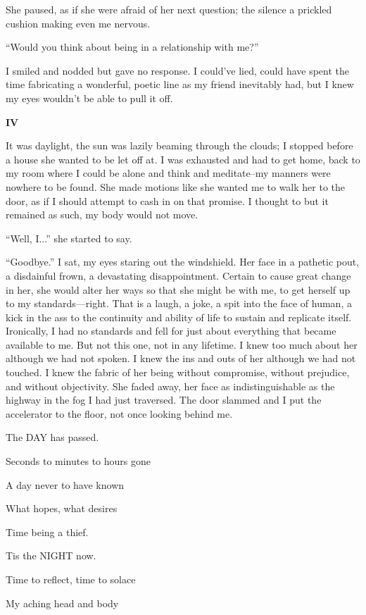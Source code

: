 She paused, as if she were afraid of her next question; the silence a
prickled cushion making even me nervous.

``Would you think about being in a relationship with me?''

I smiled and nodded but gave no response. I could've lied, could have
spent the time fabricating a wonderful, poetic line as my friend
inevitably had, but I knew my eyes wouldn't be able to pull it off.

\textbf{IV}

It was daylight, the sun was lazily beaming through the clouds; I
stopped before a house she wanted to be let off at. I was exhausted and
had to get home, back to my room where I could be alone and think and
meditate--my manners were nowhere to be found. She made motions like she
wanted me to walk her to the door, as if I should attempt to cash in on
that promise. I thought to but it remained as such, my body would not
move.

``Well, I...'' she started to say.

``Goodbye.'' I sat, my eyes staring out the windshield. Her face in a
pathetic pout, a disdainful frown, a devastating disappointment. Certain
to cause great change in her, she would alter her ways so that she might
be with me, to get herself up to my standards---right. That is a laugh,
a joke, a spit into the face of human, a kick in the ass to the
continuity and ability of life to sustain and replicate itself.
Ironically, I had no standards and fell for just about everything that
became available to me. But not this one, not in any lifetime. I knew
too much about her although we had not spoken. I knew the ins and outs
of her although we had not touched. I knew the fabric of her being
without compromise, without prejudice, and without objectivity. She
faded away, her face as indistinguishable as the highway in the fog I
had just traversed. The door slammed and I put the accelerator to the
floor, not once looking behind me.

The DAY has passed.

Seconds to minutes to hours gone

A day never to have known

What hopes, what desires

Time being a thief.

Tis the NIGHT now.

Time to reflect, time to solace

My aching head and body

